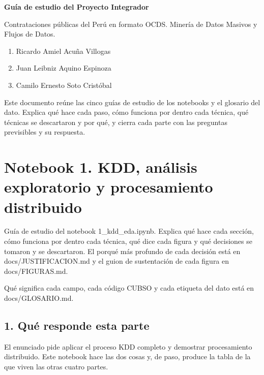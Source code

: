 \documentclass[11pt]{article}
\begin{document}
\thispagestyle{empty}
\raggedright
\vspace*{1.5em}
{\LARGE\bfseries Guía de estudio del Proyecto Integrador\par}
\vspace{1em}
{\normalsize Contrataciones públicas del Perú en formato OCDS. Minería de Datos Masivos y Flujos de Datos.\par}
\vspace{1.5em}
\begin{enumerate}
  \item Ricardo Amiel Acuña Villogas
  \item Juan Leibniz Aquino Espinoza
  \item Camilo Ernesto Soto Cristóbal
\end{enumerate}
\vspace{1.5em}
{\footnotesize Este documento reúne las cinco guías de estudio de los notebooks y el glosario del dato. Explica qué hace cada paso, cómo funciona por dentro cada técnica, qué técnicas se descartaron y por qué, y cierra cada parte con las preguntas previsibles y su respuesta.\par}
\clearpage
\tableofcontents
\clearpage

\clearpage
{}
\section*{Notebook 1. KDD, análisis exploratorio y procesamiento distribuido}
Guía de estudio del notebook 1\_\allowbreak{}kdd\_\allowbreak{}eda.ipynb. Explica qué hace cada sección, cómo funciona por dentro cada técnica, qué dice cada figura y qué decisiones se tomaron y se descartaron. El porqué más profundo de cada decisión está en docs/JUSTIFICACION.md y el guion de sustentación de cada figura en docs/FIGURAS.md.

Qué significa cada campo, cada código CUBSO y cada etiqueta del dato está en docs/GLOSARIO.md.

\subsection*{1. Qué responde esta parte}
El enunciado pide aplicar el proceso KDD completo y demostrar procesamiento distribuido. Este notebook hace las dos cosas y, de paso, produce la tabla de la que viven las otras cuatro partes.
\end{document}
